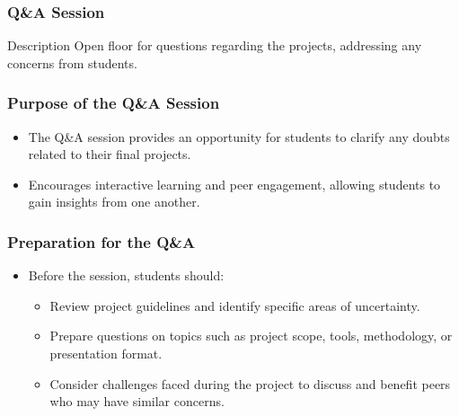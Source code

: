 \documentclass[aspectratio=169]{beamer}
\begin{document}
\begin{frame}[fragile]
    \frametitle{Q\&A Session}
    \begin{block}{Description}
        Open floor for questions regarding the projects, addressing any concerns from students.
    \end{block}
\end{frame}

\begin{frame}[fragile]
    \frametitle{Purpose of the Q\&A Session}
    \begin{itemize}
        \item The Q\&A session provides an opportunity for students to clarify any doubts related to their final projects.
        \item Encourages interactive learning and peer engagement, allowing students to gain insights from one another.
    \end{itemize}
\end{frame}

\begin{frame}[fragile]
    \frametitle{Preparation for the Q\&A}
    \begin{itemize}
        \item Before the session, students should:
        \begin{itemize}
            \item Review project guidelines and identify specific areas of uncertainty.
            \item Prepare questions on topics such as project scope, tools, methodology, or presentation format.
            \item Consider challenges faced during the project to discuss and benefit peers who may have similar concerns.
        \end{itemize}
    \end{itemize}
\end{frame}
\end{document}
